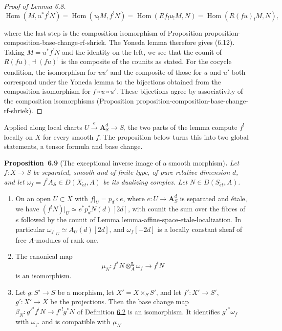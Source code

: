 \documentclass[11pt]{article}
\newenvironment{bpstatement}[2]{\par\addvspace{0.6\baselineskip}\noindent\textbf{#1}#2\textbf{.}\enspace\ignorespaces}
  {\par\addvspace{0.4\baselineskip}}
\newenvironment{bpstatementit}[2]{\begin{bpstatement}{#1}{#2}\itshape\ignorespaces}{\end{bpstatement}}
\providecommand{\Hom}{}\renewcommand{\Hom}{\operatorname{Hom}}
\begin{document}
\begin{proof}[{Proof of Lemma 6.8}]
\[
\Hom(M,u^*f^!N)
=\Hom(u_!M,f^!N)
=\Hom(Rf_!u_!M,N)
=\Hom(R(fu)_!M,N),
\]

where the last step is the composition isomorphism of Proposition proposition-composition-base-change-rf-shriek. The Yoneda lemma therefore gives (6.12). Taking \(M=u^*f^!N\) and the identity on the left, we see that the counit of \(R(fu)_!\dashv(fu)^!\) is the composite of the counits as stated. For the cocycle condition, the isomorphism for \(uu'\) and the composite of those for \(u\) and \(u'\) both correspond under the Yoneda lemma to the bijections obtained from the composition isomorphism for \(f\circ u\circ u'\). These bijections agree by associativity of the composition isomorphisms (Proposition proposition-composition-base-change-rf-shriek).
\end{proof}

\label{bp29}%
Applied along local charts \(U\xrightarrow{e}\mathbf A^d_S\to S\), the two parts of the lemma compute \(f^!\) locally on \(X\) for every smooth \(f\). The proposition below turns this into two global statements, a tensor formula and base change.

\label{bp30}%
\begin{bpstatementit}{Proposition~6.9}{ (The exceptional inverse image of a smooth morphism)}
Let \(f:X\to S\) be separated, smooth and of finite type, of pure relative dimension \(d\), and let \(\omega_f=f^!A_S\in D(X_{\acute{e}t},A)\) be its dualizing complex. Let \(N\in D(S_{\acute{e}t},A)\).

\begin{enumerate}
\item On an open \(U\subset X\) with \(f|_U=p_d\circ e\), where \(e:U\to\mathbf A^d_S\) is separated and étale, we have \((f^!N)|_U\simeq e^*p_d^*N(d)[2d]\), with counit the sum over the fibres of \(e\) followed by the counit of Lemma lemma-affine-space-etale-localization. In particular \(\omega_f|_U\simeq A_U(d)[2d]\), and \(\omega_f[-2d]\) is a locally constant sheaf of free \(A\)-modules of rank one.
\item The canonical map \[
   \mu_N:f^*N\otimes_A^{\mathbf L}\omega_f\longrightarrow f^!N
   \tag{6.13}
   \] is an isomorphism.
\item Let \(g:S'\to S\) be a morphism, let \(X'=X\times_SS'\), and let \(f':X'\to S'\), \(g':X'\to X\) be the projections. Then the base change map \(\beta_N:g'^*f^!N\to f'^!g^*N\) of Definition \hyperref[bp7]{6.2} is an isomorphism. It identifies \(g'^*\omega_f\) with \(\omega_{f'}\) and is compatible with \(\mu_N\).
\end{enumerate}
\end{bpstatementit}
\end{document}
